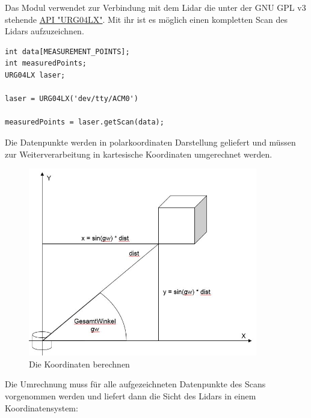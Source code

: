 Das Modul verwendet zur Verbindung mit dem Lidar die unter der GNU GPL v3 stehende \href{https://github.com/simondlevy/BreezyLidar}{API "URG04LX"}. Mit ihr ist es möglich einen kompletten Scan des Lidars aufzuzeichnen. 
\vspace{0.4cm}

\begin{lstlisting}
int data[MEASUREMENT_POINTS]; 
int measuredPoints;
URG04LX laser;

laser = URG04LX('dev/tty/ACM0')

measuredPoints = laser.getScan(data);

\end{lstlisting}
\vspace{-0.6cm}

Die Datenpunkte werden in polarkoordinaten Darstellung geliefert und müssen zur Weiterverarbeitung in kartesische Koordinaten umgerechnet werden. 

\begin{figure}[h]
\begin{center}
\includegraphics[width=10cm]{images/chapter5/LidarKoordRechnung.JPG}
\caption{Die Koordinaten berechnen}
\label{Koordinaten_errechnen}
\end{center}
\end{figure}

Die Umrechnung muss für alle aufgezeichneten Datenpunkte des Scans vorgenommen werden und liefert dann die Sicht des Lidars in einem Koordinatensystem:

